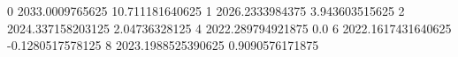 0 2033.0009765625 10.711181640625
1 2026.2333984375 3.943603515625
2 2024.337158203125 2.04736328125
4 2022.289794921875 0.0
6 2022.1617431640625 -0.1280517578125
8 2023.1988525390625 0.9090576171875
